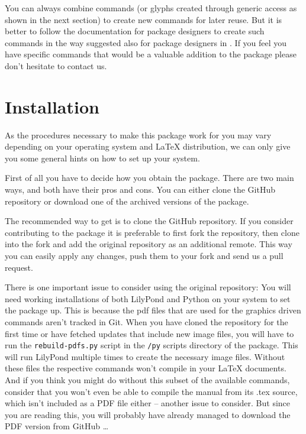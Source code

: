 \documentclass{OLLbook}
\begin{document}
You can always combine commands (or glyphs created through generic access as shown in the next section) to create new commands for later reuse. 
But it is better to follow the documentation for package designers to create such commands in the way suggested also for package designers in .
If you feel you have specific commands that would be a valuable addition to the package please don't hesitate to contact us.

\section{Installation}
\label{section:installation}
As the procedures necessary to make this package work for you may vary depending on your operating system and \LaTeX{} distribution, we can only give you some general hints on how to set up your system.

First of all you have to decide how you obtain the package.
There are two main ways, and both have their pros and cons.
You can either clone the GitHub repository or download one of the archived versions of the package.

The recommended way to get \lilyglyphs is to clone the GitHub repository.
If you consider contributing to the package it is preferable to first fork the repository, then clone into the fork and add the original repository as an additional remote.
This way you can easily apply any changes, push them to your fork and send us a pull request.

There is one important issue to consider using the original repository: You will need working installations of both LilyPond and Python on your system to set the package up.
This is because the pdf files that are used for the graphics driven commands aren't tracked in Git.
When you have cloned the repository for the first time or have fetched updates that include new image files, you will have to run the \texttt{rebuild-pdfs.py} script in the \texttt{/py} scripts directory of the package.
This will run LilyPond multiple times to create the necessary image files.
Without these files the respective commands won't compile in your \LaTeX{} documents.
And if you think you might do without this subset of the available commands, consider that you won't even be able to compile the manual from its .tex source, which isn't included as a PDF file either -- another issue to consider.
But since you are reading this, you will probably have already managed to download the PDF version from GitHub \dots
\end{document}
